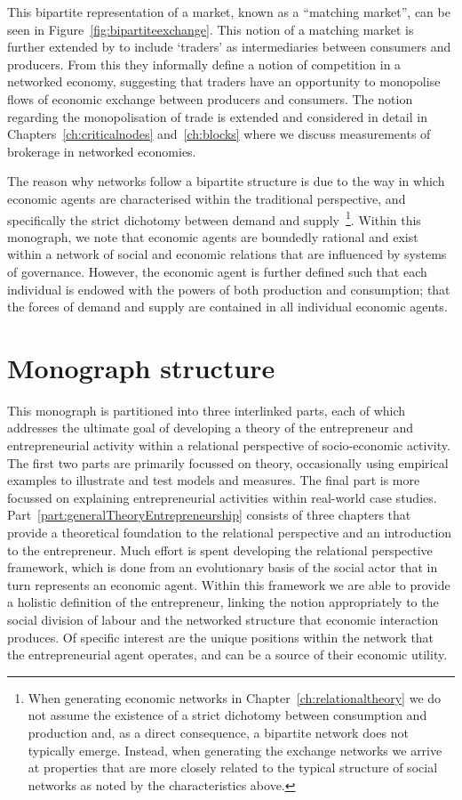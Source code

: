 This bipartite representation of a market, known as a ``matching market'', can be seen in Figure~\ref{fig:bipartiteexchange}. This notion of a matching market is further extended by \citet{EasleyKleinberg2010} to include `traders' as intermediaries between consumers and producers. From this they informally define a notion of competition in a networked economy, suggesting that traders have an opportunity to monopolise flows of economic exchange between producers and consumers. The notion regarding the monopolisation of trade is extended and considered in detail in Chapters~\ref{ch:criticalnodes} and~\ref{ch:blocks} where we discuss measurements of brokerage in networked economies.

The reason why networks follow a bipartite structure is due to the way in which economic agents are characterised within the traditional perspective, and specifically the strict dichotomy between demand and supply~\footnote{When generating economic networks in Chapter~\ref{ch:relationaltheory} we do not assume the existence of a strict dichotomy between consumption and production and, as a direct consequence, a bipartite network does not typically emerge. Instead, when generating the exchange networks we arrive at properties that are more closely related to the typical structure of social networks as noted by the characteristics above.}. Within this monograph, we note that economic agents are boundedly rational and exist within a network of social and economic relations that are influenced by systems of governance. However, the economic agent is further defined such that each individual is endowed with the powers of both production and consumption; that the forces of demand and supply are contained in all individual economic agents.

\section{Monograph structure}

This monograph is partitioned into three interlinked parts, each of which addresses the ultimate goal of developing a theory of the entrepreneur and entrepreneurial activity within a relational perspective of socio-economic activity. The first two parts are primarily focussed on theory, occasionally using empirical examples to illustrate and test models and measures. The final part is more focussed on explaining entrepreneurial activities within real-world case studies. Part~\ref{part:generalTheoryEntrepreneurship} consists of three chapters that provide a theoretical foundation to the relational perspective and an introduction to the entrepreneur. Much effort is spent developing the relational perspective framework, which is done from an evolutionary basis of the social actor that in turn represents an economic agent. Within this framework we are able to provide a holistic definition of the entrepreneur, linking the notion appropriately to the social division of labour and the networked structure that economic interaction produces. Of specific interest are the unique positions within the network that the entrepreneurial agent operates, and can be a source of their economic utility.

